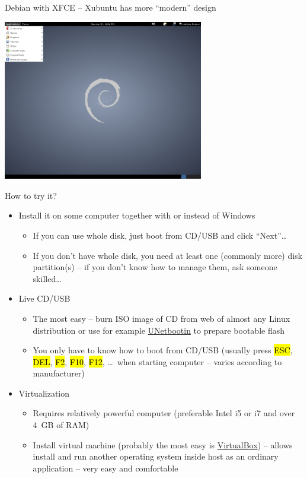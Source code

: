 \documentclass[compress, ucs, xelatex, 11pt, xcolor=svgnames,
  hyperref={
    bookmarks=true,
    unicode=true,
    colorlinks=true,
    pdftitle={Linux, command line and MetaCentrum},
    plainpages=false,
    pdfauthor={Vojtech Zeisek},
    pdfsubject={Course about use of Linux command line, writing shell scripts and using MetaCentrum of CESNET},
    pdfcreator={XeLaTeX},
    pdfkeywords={Linux, GNU, BASH, shell, command line, MetaCentrum},
    linkcolor=Red,
    anchorcolor=Blue,
    citecolor=Purple,
    filecolor=DodgerBlue,
    menucolor=DarkOrchid,
    urlcolor=DeepSkyBlue,
    pdftex},
  url={hyphens, lowtilde} %
  ]{beamer}
\renewcommand{\texttt}[1]{\hl{\ttfamily #1}}
\begin{document}
\begin{frame}{Debian with XFCE -- Xubuntu has more ``modern'' design}
\begin{center}
  \includegraphics[height=7cm]{debian.png}
\end{center}
\end{frame}

\begin{frame}{How to try it?}
\begin{itemize}
  \item Install it on some computer together with or instead of Windows
  \begin{itemize}
    \item If you can use whole disk, just boot from CD/USB and click ``Next''\ldots
    \item If you don't have whole disk, you need at least one (commonly more) disk partition(s) -- if you don't know how to manage them, ask someone skilled\ldots
  \end{itemize}
  \item Live CD/USB
  \begin{itemize}
    \item The most easy -- burn ISO image of CD from web of almost any Linux distribution or use for example \href{https://unetbootin.github.io/}{UNetbootin} to prepare bootable flash
    \item You only have to know how to boot from CD/USB (usually press \texttt{ESC}, \texttt{DEL}, \texttt{F2}, \texttt{F10}, \texttt{F12}, \ldots~when starting computer -- varies according to manufacturer)
  \end{itemize}
  \item Virtualization
  \begin{itemize}
    \item Requires relatively powerful computer (preferable Intel i5 or i7 and over 4~GB of RAM)
    \item Install virtual machine (probably the most easy is \href{https://www.virtualbox.org/}{VirtualBox}) -- allows install and run another operating system inside host as an ordinary application -- very easy and comfortable
  \end{itemize}
\end{itemize}
\end{frame}
\end{document}
